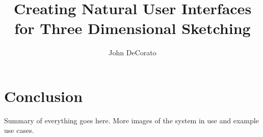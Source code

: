 \documentclass[master,tocprelim]{cornell}
\title {Creating Natural User Interfaces for Three Dimensional Sketching}
\author {John DeCorato}
\begin{document}
\maketitle
\makecopyright



\contentspage
\tablelistpage
\figurelistpage

\normalspacing \setcounter{page}{1} 
\pagestyle{cornell} \addtolength{\parskip}{0.5\baselineskip}








\chapter{Conclusion}
Summary of everything goes here. More images of the system in use and example use cases.

\printbibliography
\end{document}
